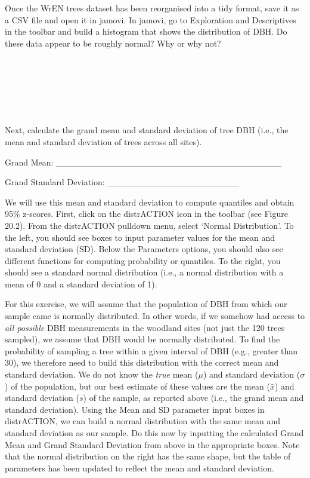 \documentclass[
]{scrbook}
\begin{document}
Once the WrEN trees dataset has been reorganised into a tidy format, save it as a CSV file and open it in jamovi.
In jamovi, go to Exploration and Descriptives in the toolbar and build a histogram that shows the distribution of DBH.
Do these data appear to be roughly normal?
Why or why not?

\begin{verbatim}






\end{verbatim}

Next, calculate the grand mean and standard deviation of tree DBH (i.e., the mean and standard deviation of trees across all sites).

Grand Mean: \_\_\_\_\_\_\_\_\_\_\_\_\_\_\_\_\_\_\_\_\_\_\_\_\_\_\_\_\_\_\_\_\_\_\_\_

Grand Standard Deviation: \_\_\_\_\_\_\_\_\_\_\_\_\_\_\_\_\_\_\_\_\_

We will use this mean and standard deviation to compute quantiles and obtain 95\% z-scores.
First, click on the distrACTION icon in the toolbar (see Figure 20.2).
From the distrACTION pulldown menu, select `Normal Distribution'.
To the left, you should see boxes to input parameter values for the mean and standard deviation (SD).
Below the Parameters options, you should also see different functions for computing probability or quantiles.
To the right, you should see a standard normal distribution (i.e., a normal distribution with a mean of 0 and a standard deviation of 1).

For this exercise, we will assume that the population of DBH from which our sample came is normally distributed.
In other words, if we somehow had access to \emph{all possible} DBH measurements in the woodland sites (not just the 120 trees sampled), we assume that DBH would be normally distributed.
To find the probability of sampling a tree within a given interval of DBH (e.g., greater than 30), we therefore need to build this distribution with the correct mean and standard deviation.
We do not know the \emph{true} mean (\(\mu\)) and standard deviation (\(\sigma\)) of the population, but our best estimate of these values are the mean (\(\bar{x}\)) and standard deviation (\(s\)) of the sample, as reported above (i.e., the grand mean and standard deviation).
Using the Mean and SD parameter input boxes in distrACTION, we can build a normal distribution with the same mean and standard deviation as our sample.
Do this now by inputting the calculated Grand Mean and Grand Standard Deviation from above in the appropriate boxes.
Note that the normal distribution on the right has the same shape, but the table of parameters has been updated to reflect the mean and standard deviation.
\end{document}
